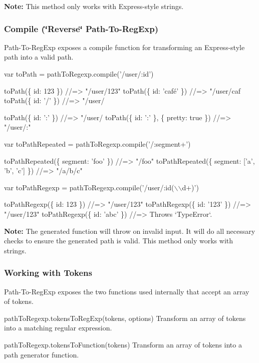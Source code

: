 {\bfseries Note\+:} This method only works with Express-\/style strings.

\subsubsection*{Compile (\char`\"{}\+Reverse\char`\"{} Path-\/\+To-\/\+Reg\+Exp)}

Path-\/\+To-\/\+Reg\+Exp exposes a compile function for transforming an Express-\/style path into a valid path.


\begin{DoxyCode}
var toPath = pathToRegexp.compile('/user/:id')

toPath(\{ id: 123 \}) //=> "/user/123"
toPath(\{ id: 'café' \}) //=> "/user/caf%
toPath(\{ id: '/' \}) //=> "/user/%

toPath(\{ id: ':' \}) //=> "/user/%
toPath(\{ id: ':' \}, \{ pretty: true \}) //=> "/user/:"

var toPathRepeated = pathToRegexp.compile('/:segment+')

toPathRepeated(\{ segment: 'foo' \}) //=> "/foo"
toPathRepeated(\{ segment: ['a', 'b', 'c'] \}) //=> "/a/b/c"

var toPathRegexp = pathToRegexp.compile('/user/:id(\(\backslash\)\(\backslash\)d+)')

toPathRegexp(\{ id: 123 \}) //=> "/user/123"
toPathRegexp(\{ id: '123' \}) //=> "/user/123"
toPathRegexp(\{ id: 'abc' \}) //=> Throws `TypeError`.
\end{DoxyCode}


{\bfseries Note\+:} The generated function will throw on invalid input. It will do all necessary checks to ensure the generated path is valid. This method only works with strings.

\subsubsection*{Working with Tokens}

Path-\/\+To-\/\+Reg\+Exp exposes the two functions used internally that accept an array of tokens.


\begin{DoxyItemize}
\item {\ttfamily path\+To\+Regexp.\+tokens\+To\+Reg\+Exp(tokens, options)} Transform an array of tokens into a matching regular expression.
\item {\ttfamily path\+To\+Regexp.\+tokens\+To\+Function(tokens)} Transform an array of tokens into a path generator function.
\end{DoxyItemize}

